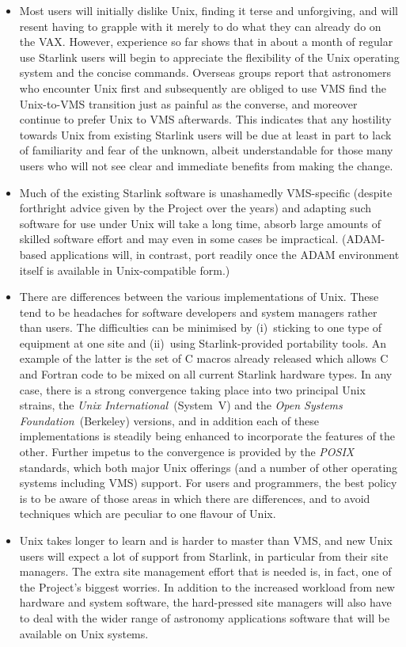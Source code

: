 \begin{itemize}
\item Most users will initially dislike Unix, finding it terse and
unforgiving, and will resent having to grapple with it merely to do what
they can already do on the VAX.  However, experience so far shows that
in about a month of regular use Starlink users will begin to appreciate
the flexibility of the Unix operating system and the concise commands.
Overseas groups report that astronomers who encounter Unix
first and subsequently are obliged to use VMS find the Unix-to-VMS
transition just as painful as the converse, and moreover continue to
prefer Unix to VMS afterwards.  This indicates that any hostility
towards Unix from existing Starlink users will be due at least in part
to lack of familiarity and fear of the unknown, albeit understandable
for those many users who will not see clear and immediate benefits from
making the change.
\item Much of the existing Starlink software is unashamedly
VMS-specific (despite forthright advice given by the Project over the
years) and adapting such software for use under Unix will take a long
time, absorb large amounts of skilled software effort and may even in
some cases be impractical.  (ADAM-based applications will, in contrast,
port readily once the ADAM environment itself is available in
Unix-compatible form.)
\item There are differences between the various implementations of
Unix.  These tend to be headaches for software developers and
system managers rather than users.  The difficulties can be minimised
by (i)~sticking to one type of equipment at one site and (ii)~using
Starlink-provided portability tools.  An example of the latter is the
set of C macros already released which allows C and Fortran code to
be mixed on all current Starlink hardware types.  In any case, there is
a strong convergence taking place into two principal Unix strains, the
{\it Unix International}\, (System~V) and the {\it Open Systems
Foundation}\, (Berkeley) versions, and in addition each of these
implementations is steadily being enhanced to incorporate the
features of the other.  Further impetus to the convergence is provided
by the {\it POSIX}\, standards, which both major Unix offerings (and a
number of other operating systems including VMS) support.  For users and
programmers, the best policy is to be aware of those areas in which
there are differences, and to avoid techniques which are peculiar to one
flavour of Unix.
\item Unix takes longer to learn and is harder to master than VMS, and
new Unix users will expect a lot of support from Starlink, in particular
from their site managers.  The extra site management effort that is
needed is, in fact, one of the Project's biggest worries.  In addition
to the increased workload from new hardware and system software, the
hard-pressed site managers will also have to deal with the wider range
of astronomy applications software that will be available on Unix
systems.
\end{itemize}

